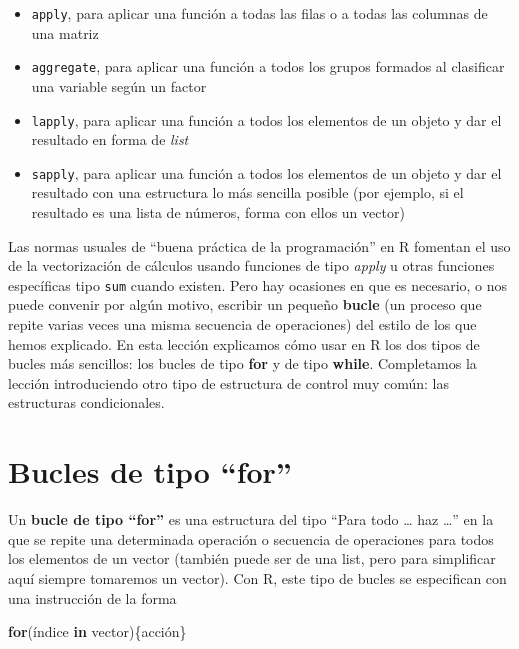 \documentclass[]{book}
\newenvironment{Shaded}{\begin{snugshade}}{\end{snugshade}}
\newcommand{\ControlFlowTok}[1]{\textcolor[rgb]{0.13,0.29,0.53}{\textbf{#1}}}
\newcommand{\NormalTok}[1]{#1}
\theoremstyle{definition}
\theoremstyle{definition}
\theoremstyle{definition}
\theoremstyle{remark}
\begin{document}
\begin{itemize}
\item
  \texttt{apply}, para aplicar una función a todas las filas o a todas las columnas de una matriz
\item
  \texttt{aggregate}, para aplicar una función a todos los grupos formados al clasificar una variable según un factor
\item
  \texttt{lapply}, para aplicar una función a todos los elementos de un objeto y dar el resultado en forma de \emph{list}
\item
  \texttt{sapply}, para aplicar una función a todos los elementos de un objeto y dar el resultado con una estructura lo más sencilla posible (por ejemplo, si el resultado es una lista de números, forma con ellos un vector)
\end{itemize}

Las normas usuales de ``buena práctica de la programación'' en R fomentan el uso de la vectorización de cálculos usando funciones de tipo \emph{apply} u otras funciones específicas tipo \texttt{sum} cuando existen. Pero hay ocasiones en que es necesario, o nos puede convenir por algún motivo, escribir un pequeño \textbf{bucle} (un proceso que repite varias veces una misma secuencia de operaciones) del estilo de los que hemos explicado. En esta lección explicamos cómo usar en R los dos tipos de bucles más sencillos: los bucles de tipo \textbf{for} y de tipo \textbf{while}. Completamos la lección introduciendo otro tipo de estructura de control muy común: las estructuras condicionales.

\hypertarget{bucles-de-tipo-for}{%
\section{Bucles de tipo ``for''}\label{bucles-de-tipo-for}}

Un \textbf{bucle de tipo ``for''} es una estructura del tipo ``Para todo \ldots{} haz \ldots{}'' en la que se repite una determinada operación o secuencia de operaciones para todos los elementos de un vector (también puede ser de una list, pero para simplificar aquí siempre tomaremos un vector). Con R, este tipo de bucles se especifican con una instrucción de la forma

\begin{Shaded}
\begin{Highlighting}[]
\ControlFlowTok{for}\NormalTok{(índice }\ControlFlowTok{in}\NormalTok{ vector)\{acción\}}
\end{Highlighting}
\end{Shaded}
\end{document}
